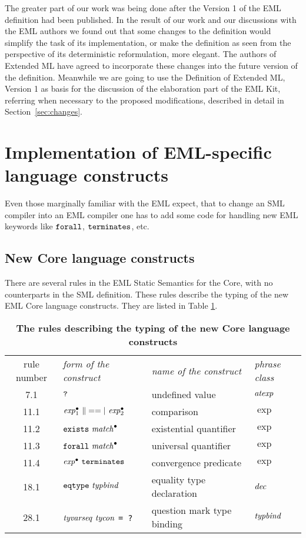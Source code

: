 The greater part of our work was being done after
the Version 1 of the EML definition \cite{bib:KST94} had been published.
In the result of our work and our discussions with the EML authors
we found out that some changes to the definition
would simplify the task of its implementation, or make the definition
as seen from the perspective of its deterministic reformulation,
more elegant. The authors of Extended ML
have agreed to incorporate these changes into the
future version of the definition. Meanwhile we are going
to use the Definition of Extended ML, Version 1 as basis for
the discussion of the elaboration part of the EML Kit,
referring when necessary to the proposed modifications,
described in detail in Section~\ref{sec:changes}.

\section{Implementation of EML-specific language constructs}
\label{sec:eml-spec}

Even those marginally familiar with the EML expect, that to change an SML compiler 
into an EML compiler one has to add some code for handling
new EML keywords like ${\tt forall}$, ${\tt terminates}$, etc. 

\subsection{New Core language constructs}
\label{sec:corestructs}

There are several rules in the EML Static Semantics for the Core, 
with no counterparts in the SML definition.
These rules describe the typing of the new EML Core language constructs.
They are listed in Table \ref{tab:new_core}.

\begin{longtable}{clll}
\caption[The rules describing the typing of the new Core language constructs]
{\bf  The rules describing the typing of the new Core language constructs\label{tab:new_core}}\\
 rule number & \sl form of the construct & \sl name of the construct & \sl phrase class\\
7.1   &  {$\mbox{\tt ?}$}         & undefined value            &  ${\it atexp}$   \\
11.1  &  $\expb_1\ \|==|\ \expb_2$ & comparison          &  $\exp$     \\            
11.2  &  {$\mbox{${\tt exists}\ {\it match}^\bullet$}$}     & existential quantifier     &  $\exp$     \\
11.3  &  {$\mbox{${\tt forall}\ {\it match}^\bullet$}$}     & universal quantifier       &  $\exp$     \\
11.4  &  {$\mbox{${\it exp}^\bullet\ {\tt terminates}$}$}       & convergence predicate      &  $\exp$     \\
18.1  &  $\EQTYPE\ \typbind$     & equality type declaration  &  ${\it dec}$     \\
28.1  &  $\tyvarseq\ \tycon$ {\tt = ?} & question mark type binding &  ${\it typbind}$ \\ 
\end{longtable}

